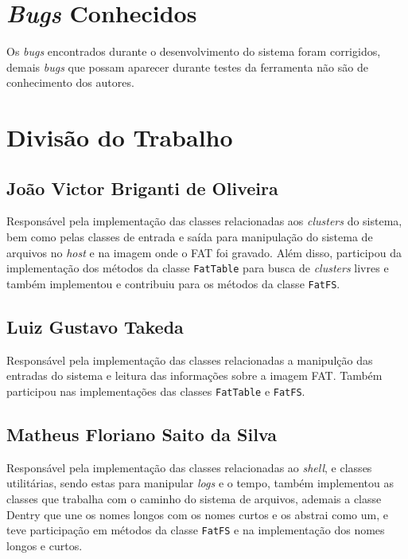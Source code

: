 \documentclass[
    12pt,				%
    oneside,   	        %
    a4paper,			%
    english,			%
    french,				%
    spanish,			%
    brazil,				%
    ]{pacotes/abntex2}
\begin{document}
\section{\textit{Bugs} Conhecidos}
\label{sec:bugs}

Os \textit{bugs} encontrados durante o desenvolvimento do sistema foram corrigidos, demais \textit{bugs} que possam aparecer durante testes da ferramenta não são de conhecimento dos autores.

\section{Divisão do Trabalho}
\label{sec:trabalhadores_univos}

\subsection{João Victor Briganti de Oliveira}
\label{subsec:joao}

Responsável pela implementação das classes relacionadas aos \textit{clusters} do sistema, bem como pelas classes de entrada e saída para manipulação do sistema de arquivos no \textit{host} e na imagem onde o FAT foi gravado. Além disso, participou da implementação dos métodos da classe \texttt{FatTable} para busca de \textit{clusters} livres e também implementou e contribuiu para os métodos da classe \texttt{FatFS}.

\subsection{Luiz Gustavo Takeda}
\label{subsec:luizinho}

Responsável pela implementação das classes relacionadas a manipulção das entradas do sistema e leitura das informações sobre a imagem FAT. Também participou nas implementações das classes \texttt{FatTable} e \texttt{FatFS}.  

\subsection{Matheus Floriano Saito da Silva}
\label{subsec:peixoto}
Responsável pela implementação das classes relacionadas ao \textit{shell}, e classes utilitárias, sendo estas para manipular \textit{logs} e o tempo, também implementou as classes que trabalha com o caminho do sistema de arquivos, ademais a classe Dentry que une os nomes longos com os nomes curtos e os abstrai como um, e teve participação em métodos da classe \texttt{FatFS} e na implementação dos nomes longos e curtos.
\end{document}
